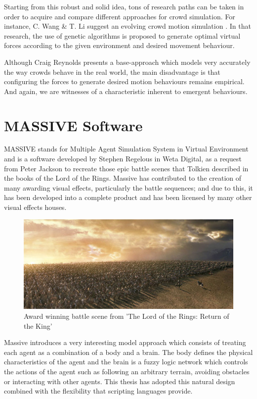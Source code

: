 Starting from this robust and solid idea, tons of research paths can be taken in order to acquire and compare different approaches for crowd simulation. For instance, C. Wang \& T. Li suggest an evolving crowd motion simulation \citep{wang}. In that research, the use of genetic algorithms is proposed to generate optimal virtual forces according to the given environment and desired movement behaviour.

Although Craig Reynolds presents a base-approach which models very accurately the way crowds behave in the real world, the main disadvantage is that configuring the forces to generate desired motion behaviours remains empirical. And again, we are witnesses of a characteristic inherent to emergent behaviours.

\section{MASSIVE Software}

MASSIVE stands for Multiple Agent Simulation System in Virtual Environment and is a software developed by Stephen Regelous in Weta Digital, as a request from Peter Jackson to recreate those epic battle scenes that Tolkien described in the books of the Lord of the Rings. Massive has contributed to the creation of many awarding visual effects, particularly  the battle sequences; and due to this, it has been developed into a complete product and has been licensed by many other visual effects houses.

\begin{figure}[!htb]
  \centering
  \includegraphics[scale=0.5]{rohan_army.eps}
  \caption[Massive Software]{Award winning battle scene from 'The Lord of the Rings: Return of the King'}
  \label{fig:massive}
\end{figure}

Massive introduces a very interesting model approach which consists of treating each agent as a combination of a body and a brain. The body defines the physical characteristics of the agent and the brain is a fuzzy logic network which controls the actions of the agent such as following an arbitrary terrain, avoiding obstacles or interacting with other agents. This thesis has adopted this natural design combined with the flexibility that scripting languages provide.

